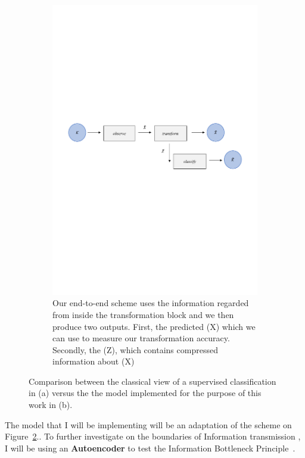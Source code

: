 \begin{figure}[h]
\begin{subfigure}{1\textwidth} 
  \centering
  \includegraphics[width=16.5cm]{Figuras_tfg/Figura1_1_tfg}
  \caption{Our end-to-end scheme uses the information regarded from inside the transformation block and we then produce two outputs. First, the predicted (X) which we can use to measure our transformation accuracy. Secondly, the (Z), which contains compressed information about (X)}
  \label{fig:fig1a} 
\end{subfigure}%
\caption{Comparison between the classical view of a supervised classification in (a) versus the the model implemented for the purpose of this work in (b).}
\label{fig:fig1}
\end{figure}


The model that I will be implementing will be an adaptation of the scheme on Figure~\ref{fig:fig1}.. To further investigate on the boundaries of Information transmission , I will be using an \textbf{Autoencoder} to test the Information Bottleneck Principle~\cite{refToInfBottleNeck}. 

